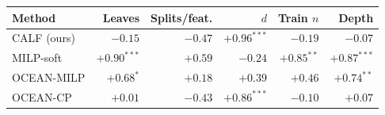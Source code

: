 \begin{tabular}{lrrrrr}
\toprule
Method & Leaves & Splits/feat. & $d$ & Train $n$ & Depth \\
\midrule
CALF (ours) & $-0.15$ & $-0.47$ & $+0.96^{***}$ & $-0.19$ & $-0.07$ \\
MILP-soft & $+0.90^{***}$ & $+0.59$ & $-0.24$ & $+0.85^{**}$ & $+0.87^{***}$ \\
OCEAN-MILP & $+0.68^{*}$ & $+0.18$ & $+0.39$ & $+0.46$ & $+0.74^{**}$ \\
OCEAN-CP & $+0.01$ & $-0.43$ & $+0.86^{***}$ & $-0.10$ & $+0.07$ \\
\bottomrule
\end{tabular}

